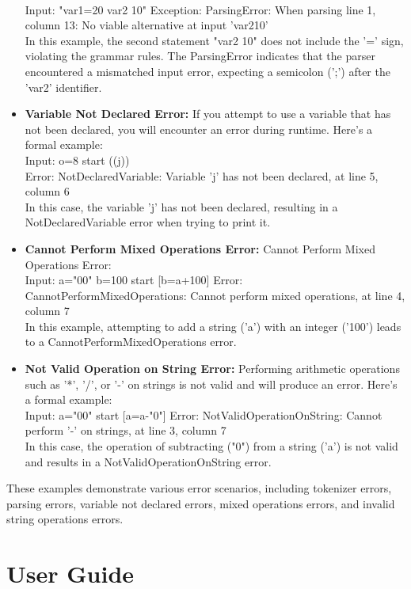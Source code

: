 \begin{itemize}
                \\Input: "var1=20 var2 10" Exception: ParsingError: When parsing line 1, column 13: No viable alternative at input 'var210'
                \\In this example, the second statement "var2 10" does not include the '=' sign, violating the grammar rules. The ParsingError indicates that the parser encountered a mismatched input error, expecting a semicolon (';') after the 'var2' identifier.
                \item \textbf{Variable Not Declared Error:} If you attempt to use a variable that has not been declared, you will encounter an error during runtime. Here's a formal example:
                \\Input: o=8 start { ((j)) } 
                \\Error: NotDeclaredVariable: Variable 'j' has not been declared, at line 5, column 6
                \\In this case, the variable 'j' has not been declared, resulting in a NotDeclaredVariable error when trying to print it.
                \item \textbf{Cannot Perform Mixed Operations Error:} Cannot Perform Mixed Operations Error: 
                \\Input: a="00" b=100 start { [b=a+100] } Error: CannotPerformMixedOperations: Cannot perform mixed operations, at line 4, column 7
                \\In this example, attempting to add a string ('a') with an integer ('100') leads to a CannotPerformMixedOperations error.
                \item \textbf{Not Valid Operation on String Error:} Performing arithmetic operations such as '*', '/', or '-' on strings is not valid and will produce an error. Here's a formal example:
                \\Input: a="00" start { [a=a-"0"] } Error: NotValidOperationOnString: Cannot perform '-' on strings, at line 3, column 7
                \\In this case, the operation of subtracting ("0") from a string ('a') is not valid and results in a NotValidOperationOnString error.
 \end{itemize}
 
\noindent These examples demonstrate various error scenarios, including tokenizer errors, parsing errors, variable not declared errors, mixed operations errors, and invalid string operations errors.
 \section{User Guide}

